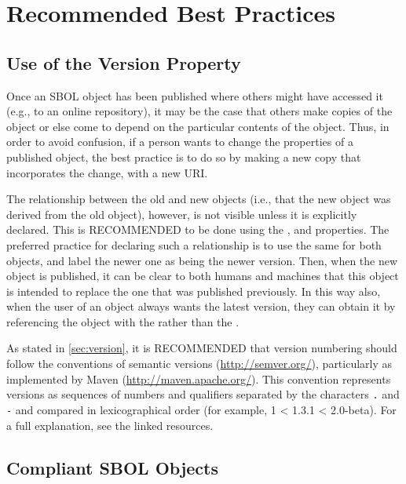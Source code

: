\section{Recommended Best Practices}
\label{sec:bestpractices}
\subsection{Use of the Version Property}

Once an SBOL object has been published where others might have accessed it (e.g., to an online repository), it may be the case that others make copies of the object or else come to depend on the particular contents of the object.  Thus, in order to avoid confusion, if a person wants to change the properties of a published object, the best practice is to do so by making a new copy that incorporates the change, with a new URI.

The relationship between the old and new objects (i.e., that the new object was derived from the old object), however, is not visible unless it is explicitly declared.  This is RECOMMENDED to be done using the , and  properties. The preferred practice for declaring such a relationship is to use the same  for both objects, and label the newer one as being the newer version. Then, when the new object is published, it can be clear to both humans and machines that this object is intended to replace the one that was published previously.  In this way also, when the user of an object always wants the latest version, they can obtain it by referencing the object with the  rather than the .

As stated in \ref{sec:version},  it is RECOMMENDED that version numbering should follow the conventions of semantic versions (\url{http://semver.org/}), particularly as implemented by Maven (\url{http://maven.apache.org/}).  This convention represents versions as sequences of numbers and qualifiers separated by the characters {\tt .} and {\tt -} and compared in lexicographical order (for example, 1 < 1.3.1 < 2.0-beta).  For a full explanation, see the linked resources.

\subsection{Compliant SBOL Objects}
\label{sec:compliant}

